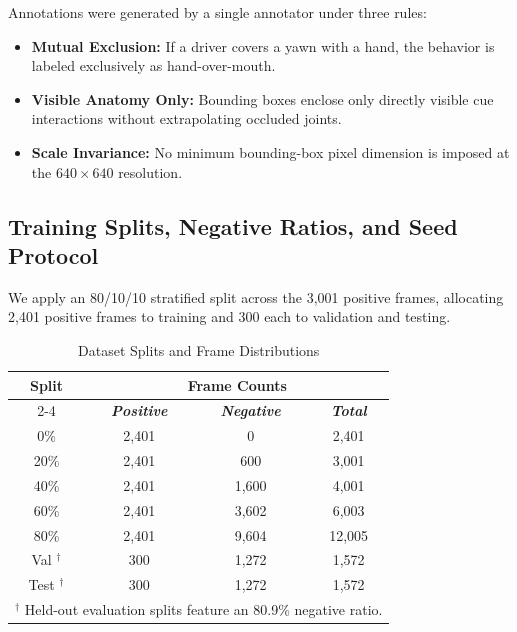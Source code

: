 \documentclass[conference]{IEEEtran}
\begin{document}
Annotations were generated by a single annotator under three rules:
\begin{itemize}
    \item \textbf{Mutual Exclusion:} If a driver covers a yawn with a hand, the behavior is labeled exclusively as hand-over-mouth.
    \item \textbf{Visible Anatomy Only:} Bounding boxes enclose only directly visible cue interactions without extrapolating occluded joints.
    \item \textbf{Scale Invariance:} No minimum bounding-box pixel dimension is imposed at the $640 \times 640$ resolution.
\end{itemize}

\subsection{Training Splits, Negative Ratios, and Seed Protocol}
\label{subsec:splits}
We apply an 80/10/10 stratified split across the 3,001 positive frames, allocating 2,401 positive frames to training and 300 each to validation and testing.

\begin{table}[htbp]
\caption{Dataset Splits and Frame Distributions}
\label{tab:splits}
\begin{center}
\begin{tabular}{|c|c|c|c|}
\hline
\textbf{Split} & \multicolumn{3}{|c|}{\textbf{Frame Counts}} \\
\cline{2-4}
& \textbf{\textit{Positive}} & \textbf{\textit{Negative}} & \textbf{\textit{Total}} \\
\hline
0\%                 & 2,401 & 0     & 2,401  \\
20\%                & 2,401 & 600   & 3,001  \\
40\%                & 2,401 & 1,600 & 4,001  \\
60\%                & 2,401 & 3,602 & 6,003  \\
80\%                & 2,401 & 9,604 & 12,005 \\
\hline
Val $^{\dagger}$    & 300   & 1,272 & 1,572  \\
Test $^{\dagger}$   & 300   & 1,272 & 1,572  \\
\hline
\multicolumn{4}{l}{$^{\dagger}$ Held-out evaluation splits feature an 80.9\% negative ratio.}
\end{tabular}
\end{center}
\end{table}
\end{document}
